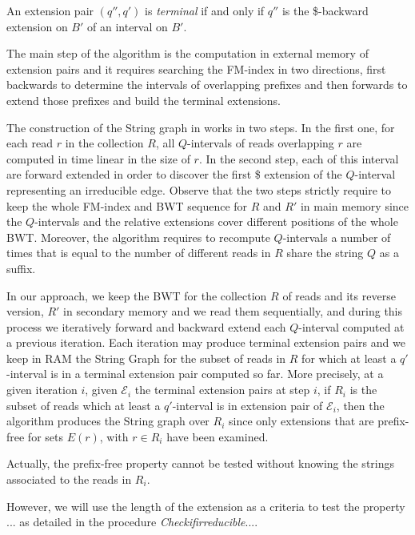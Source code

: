 \documentclass[runningheads,envcountsame,a4paper]{llncs}
\newcommand{\notaestesa}[2]{%
  {\sffamily {\bfseries #1}{\footnotesize #2}}%
  \marginpar{\framebox{\Large *}}%
}
\begin{document}
An extension pair $(q'', q')$ is \emph{terminal} if and only if $q''$ is the \$-backward extension on $B'$ of an interval on $B'$.
\notaestesa{Paola}{rivedere anche in termini informali}


The main step of the algorithm is the computation in external memory of extension pairs and it requires   searching the FM-index in two directions, first backwards to determine the intervals of overlapping prefixes and then forwards to extend those prefixes and build the terminal extensions.

The construction of the String graph in \cite{Simpson2010} works in two steps. In the first one,  for each read $r$ in the collection $R$, all $Q$-intervals of reads overlapping  $r$ are computed
in time linear in the size of  $r$.  In the second step, each of this interval are forward extended in order to discover the first \$ extension of the $Q$-interval representing an irreducible edge.
Observe that the two steps strictly require to keep the  whole FM-index and BWT sequence for $R$ and $R'$  in main memory since the $Q$-intervals and the relative extensions cover different positions of  the whole BWT. Moreover, the algorithm requires to recompute   $Q$-intervals  a number of times that is equal to the number of  different reads in $R$ share the string  $Q$
as a suffix.


In our approach, we keep the BWT for the collection $R$ of reads and its reverse version, $R'$ in secondary memory and we read them sequentially, and during this process we iteratively forward and backward extend each $Q$-interval computed at a previous iteration.
Each iteration may produce terminal extension pairs and we keep in RAM the String Graph for the subset of reads in  $R$ for which at least a $q'$-interval is in a terminal extension pair computed so far.  More precisely, at a given iteration $i$, given $\mathcal{E}_i$  the terminal extension pairs at step $i$, if $R_i$ is the subset of reads which at least a $q'$-interval is in  extension pair of
$\mathcal{E}_i$, then the algorithm produces the String graph over $R_i$ since only extensions that are prefix-free for sets $E(r)$, with $r \in R_i$ have been examined.

Actually, the prefix-free property cannot be tested without knowing the strings associated to the reads in $R_i$.

 However,  we will use the length of the extension as a criteria to test the property ... as detailed  in the procedure \emph{Checkifirreducible}....
\end{document}

